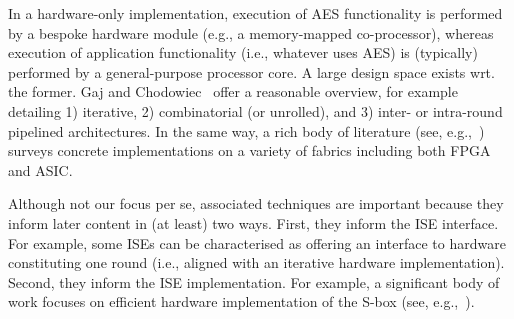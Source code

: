 
In a hardware-only implementation,
execution of 
AES         functionality
is 
performed by 
a bespoke hardware module (e.g., a memory-mapped co-processor),
whereas
execution of 
application functionality (i.e., whatever uses AES)
is (typically)
performed by 
a general-purpose processor core.
A large design space exists wrt. the former.
Gaj and Chodowiec~\cite[Section 3.3]{GajCho:00}
offer a reasonable overview, for example detailing
1) iterative,
2) combinatorial
   (or unrolled),
   and
3) inter- or intra-round
   pipelined
   architectures.
In the same way, a rich body of literature
(see, e.g.,~\cite{PMDW:04,GooBen:05,GajCho:09})
surveys concrete implementations on a variety of fabrics including both FPGA 
and ASIC.

Although not our focus per se, associated techniques are important because
they inform later content in (at least) two ways.
First,
they inform the ISE interface.
For example, some ISEs can be characterised as offering an interface to
hardware constituting one round 
(i.e., aligned with an iterative hardware implementation).
Second,
they inform the ISE implementation.
For example, a significant body of work focuses on efficient hardware 
implementation of the S-box
(see, e.g.,~\cite{Canright:05,BoyPer:12,ReyTahAsh:18}).

